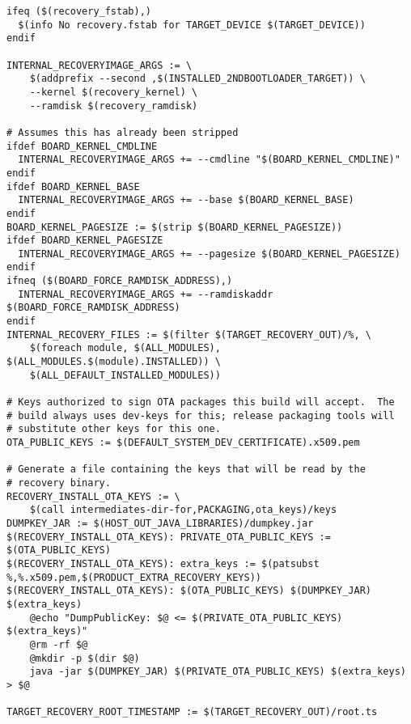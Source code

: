 \documentclass[12pt,a4paper]{article}
\begin{document}
\begin{verbatim}
ifeq ($(recovery_fstab),)
  $(info No recovery.fstab for TARGET_DEVICE $(TARGET_DEVICE))
endif

INTERNAL_RECOVERYIMAGE_ARGS := \
	$(addprefix --second ,$(INSTALLED_2NDBOOTLOADER_TARGET)) \
	--kernel $(recovery_kernel) \
	--ramdisk $(recovery_ramdisk)

# Assumes this has already been stripped
ifdef BOARD_KERNEL_CMDLINE
  INTERNAL_RECOVERYIMAGE_ARGS += --cmdline "$(BOARD_KERNEL_CMDLINE)"
endif
ifdef BOARD_KERNEL_BASE
  INTERNAL_RECOVERYIMAGE_ARGS += --base $(BOARD_KERNEL_BASE)
endif
BOARD_KERNEL_PAGESIZE := $(strip $(BOARD_KERNEL_PAGESIZE))
ifdef BOARD_KERNEL_PAGESIZE
  INTERNAL_RECOVERYIMAGE_ARGS += --pagesize $(BOARD_KERNEL_PAGESIZE)
endif
ifneq ($(BOARD_FORCE_RAMDISK_ADDRESS),)
  INTERNAL_RECOVERYIMAGE_ARGS += --ramdiskaddr $(BOARD_FORCE_RAMDISK_ADDRESS)
endif
INTERNAL_RECOVERY_FILES := $(filter $(TARGET_RECOVERY_OUT)/%, \
	$(foreach module, $(ALL_MODULES), $(ALL_MODULES.$(module).INSTALLED)) \
	$(ALL_DEFAULT_INSTALLED_MODULES))

# Keys authorized to sign OTA packages this build will accept.  The
# build always uses dev-keys for this; release packaging tools will
# substitute other keys for this one.
OTA_PUBLIC_KEYS := $(DEFAULT_SYSTEM_DEV_CERTIFICATE).x509.pem

# Generate a file containing the keys that will be read by the
# recovery binary.
RECOVERY_INSTALL_OTA_KEYS := \
	$(call intermediates-dir-for,PACKAGING,ota_keys)/keys
DUMPKEY_JAR := $(HOST_OUT_JAVA_LIBRARIES)/dumpkey.jar
$(RECOVERY_INSTALL_OTA_KEYS): PRIVATE_OTA_PUBLIC_KEYS := $(OTA_PUBLIC_KEYS)
$(RECOVERY_INSTALL_OTA_KEYS): extra_keys := $(patsubst %,%.x509.pem,$(PRODUCT_EXTRA_RECOVERY_KEYS))
$(RECOVERY_INSTALL_OTA_KEYS): $(OTA_PUBLIC_KEYS) $(DUMPKEY_JAR) $(extra_keys)
	@echo "DumpPublicKey: $@ <= $(PRIVATE_OTA_PUBLIC_KEYS) $(extra_keys)"
	@rm -rf $@
	@mkdir -p $(dir $@)
	java -jar $(DUMPKEY_JAR) $(PRIVATE_OTA_PUBLIC_KEYS) $(extra_keys) > $@

TARGET_RECOVERY_ROOT_TIMESTAMP := $(TARGET_RECOVERY_OUT)/root.ts


\end{verbatim}
\end{document}
